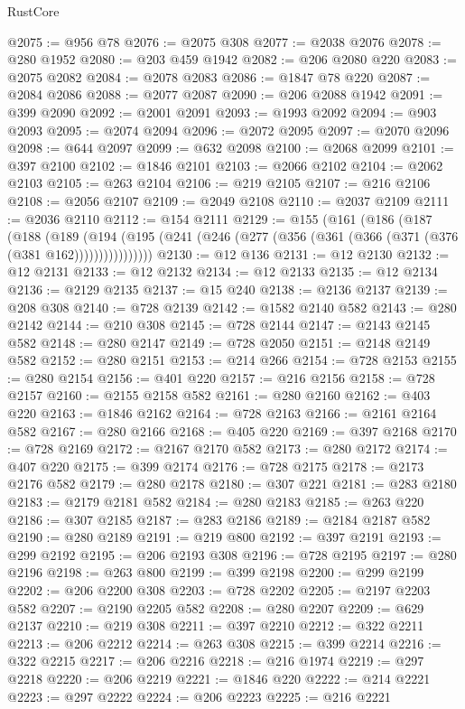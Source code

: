 \begin{lexlean}{RustCore}
\begin{coremodule}
@2075 := @956 @78
@2076 := @2075 @308
@2077 := @2038 @2076
@2078 := @280 @1952
@2080 := @203 @459 @1942
@2082 := @206 @2080 @220
@2083 := @2075 @2082
@2084 := @2078 @2083
@2086 := @1847 @78 @220
@2087 := @2084 @2086
@2088 := @2077 @2087
@2090 := @206 @2088 @1942
@2091 := @399 @2090
@2092 := @2001 @2091
@2093 := @1993 @2092
@2094 := @903 @2093
@2095 := @2074 @2094
@2096 := @2072 @2095
@2097 := @2070 @2096
@2098 := @644 @2097
@2099 := @632 @2098
@2100 := @2068 @2099
@2101 := @397 @2100
@2102 := @1846 @2101
@2103 := @2066 @2102
@2104 := @2062 @2103
@2105 := @263 @2104
@2106 := @219 @2105
@2107 := @216 @2106
@2108 := @2056 @2107
@2109 := @2049 @2108
@2110 := @2037 @2109
@2111 := @2036 @2110
@2112 := @154 @2111
@2129 := @155
    (@161
      (@186
        (@187
          (@188
            (@189
              (@194 (@195 (@241 (@246 (@277 (@356 (@361 (@366 (@371 (@376 (@381 @162))))))))))))))))
@2130 := @12 @136
@2131 := @12 @2130
@2132 := @12 @2131
@2133 := @12 @2132
@2134 := @12 @2133
@2135 := @12 @2134
@2136 := @2129 @2135
@2137 := @15 @240
@2138 := @2136 @2137
@2139 := @208 @308
@2140 := @728 @2139
@2142 := @1582 @2140 @582
@2143 := @280 @2142
@2144 := @210 @308
@2145 := @728 @2144
@2147 := @2143 @2145 @582
@2148 := @280 @2147
@2149 := @728 @2050
@2151 := @2148 @2149 @582
@2152 := @280 @2151
@2153 := @214 @266
@2154 := @728 @2153
@2155 := @280 @2154
@2156 := @401 @220
@2157 := @216 @2156
@2158 := @728 @2157
@2160 := @2155 @2158 @582
@2161 := @280 @2160
@2162 := @403 @220
@2163 := @1846 @2162
@2164 := @728 @2163
@2166 := @2161 @2164 @582
@2167 := @280 @2166
@2168 := @405 @220
@2169 := @397 @2168
@2170 := @728 @2169
@2172 := @2167 @2170 @582
@2173 := @280 @2172
@2174 := @407 @220
@2175 := @399 @2174
@2176 := @728 @2175
@2178 := @2173 @2176 @582
@2179 := @280 @2178
@2180 := @307 @221
@2181 := @283 @2180
@2183 := @2179 @2181 @582
@2184 := @280 @2183
@2185 := @263 @220
@2186 := @307 @2185
@2187 := @283 @2186
@2189 := @2184 @2187 @582
@2190 := @280 @2189
@2191 := @219 @800
@2192 := @397 @2191
@2193 := @299 @2192
@2195 := @206 @2193 @308
@2196 := @728 @2195
@2197 := @280 @2196
@2198 := @263 @800
@2199 := @399 @2198
@2200 := @299 @2199
@2202 := @206 @2200 @308
@2203 := @728 @2202
@2205 := @2197 @2203 @582
@2207 := @2190 @2205 @582
@2208 := @280 @2207
@2209 := @629 @2137
@2210 := @219 @308
@2211 := @397 @2210
@2212 := @322 @2211
@2213 := @206 @2212
@2214 := @263 @308
@2215 := @399 @2214
@2216 := @322 @2215
@2217 := @206 @2216
@2218 := @216 @1974
@2219 := @297 @2218
@2220 := @206 @2219
@2221 := @1846 @220
@2222 := @214 @2221
@2223 := @297 @2222
@2224 := @206 @2223
@2225 := @216 @2221

\end{coremodule}
\end{lexlean}
